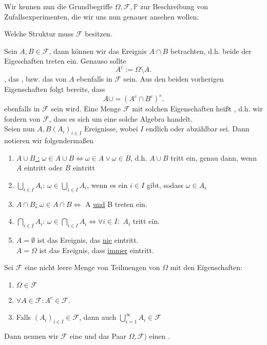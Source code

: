 Wir kennen nun die Grundbegriffe $\Omega, \mathcal{F}, \mathbb{P}$ zur Beschreibung von Zufallsexperimenten, die wir uns nun genauer ansehen wollen:
\begin{question}
    Welche Struktur muss $\mathcal{F}$ besitzen.
\end{question}
Sein $A,B\in \mathcal{F}$, dann können wir das Ereignis $A \cap B$ betrachten, d.h. beide der Eigeschaften treten ein. Genauso sollte
 \[
A^{c} := \Omega \setminus A 
.\] 
, das , bzw. das  von $A$ ebenfalls in  $\mathcal{F}$  sein. Aus den beiden vorherigen Eigenschaften folgt bereits, dass
\[
    A \cup = (A^{c} \cap B^{c})^{c}
.\] 
ebenfalls in $\mathcal{F}$ sein wird. Eine Menge $\mathcal{F}$ mit solchen Eigenschaften heißt , d.h. wir fordern von $\mathcal{F}$, dass es sich um eine solche Algebra handelt.  \\
Seien nun $A,B(A_i)_{i\in I}$  Ereignisse, wobei $I$ endlich oder abzählbar sei. Dann notieren wir folgendermaßen
\begin{enumerate}[label=\protect\circled{\alph*}]
\item \underline{$A \cup B$ :} $ω\in A \cup B \iff  ω\in A \lor ω\in B$, d.h. $A\cup B$ tritt ein, genau dann, wenn  $A$ eintritt oder  $B$ eintritt 
    \item  $\bigcup_{i \in  I} A_i$: $ω\in \bigcup_{i \in  I} A_i$, wenn es ein $i\in I$ gibt, sodass $\omega \in A_i$
    \item  \underline{$A \cap B$:} $\omega\in A \cap B \iff  $ A \underline{und} B treten ein.
    \item $\bigcap_{i \in I} A_i$:  $\omega\in \bigcap_{i \in I}A_i \iff \forall i \in I \colon$ $A_i$ tritt ein.
\item $A = \emptyset$ ist das Ereignis, das  \underline{nie} eintritt. \\
    $A = \Omega$ ist das Ereignis, dass \underline{immer} eintritt.
\end{enumerate}

\begin{definition}
    Sei $\mathcal{F}$ eine nicht leere Menge von Teilmengen von $\Omega$ mit den Eigenschaften:
    \begin{enumerate}[label=\protect\circled{\alph*}]
        \item $\Omega \in \mathcal{F}$
        \item $\forall A\in \mathcal{F} \colon A^{c}\in \mathcal{F}$.
        \item Falls $(A_i)_{i \in I}\in \mathcal{F}$, dann auch $\bigcup_{i=1} ^{\infty}A_i \in \mathcal{F}$
    \end{enumerate}
    Dann nennen wir $\mathcal{F}$ eine  und das Paar $\Omega, \mathcal{F})$ einen . 
\end{definition}

